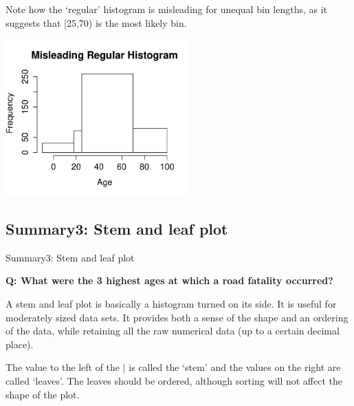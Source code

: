 \documentclass[t,xcolor=pdftex,dvipsnames,table]{beamer}
\begin{document}
\begin{frame}[fragile]{}
Note how the `regular' histogram is misleading for unequal bin lengths, as it suggests that [25,70) is the most likely bin.


\vspace{.5cm}
\includegraphics[height=6cm]{../images/AgeMisleadingHist.pdf}
\end{frame}

\subsection[]{Summary3: Stem and leaf plot}
\begin{frame}[fragile]{Summary3: Stem and leaf plot}

{\bf Q: What were the 3 highest ages at which a road fatality occurred?}

\vspace{.5cm}
A stem and leaf plot is basically a histogram turned on its side. It is useful for moderately sized data sets. It provides both a sense of the shape and an ordering of the data, while retaining all the raw numerical data (up to a certain decimal place). 

\vspace{.5cm}
The value to the left of the $\mid$ is called the ‘stem’ and the values on the right are called ‘leaves’.
The leaves should be ordered, although sorting will not affect the shape of the plot.
\end{frame}
\end{document}
